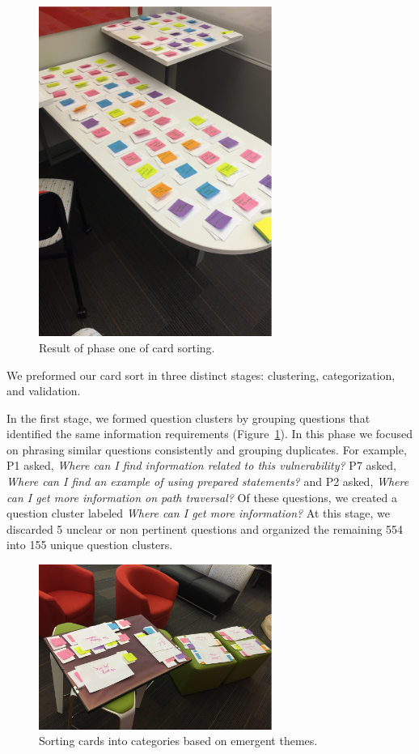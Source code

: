 \documentclass[conference]{IEEEtran}
\begin{document}
\begin{figure}
\centering
\includegraphics[width=3in]{Images/notecards.pdf}
\caption{Result of phase one of card sorting.}
\label{fig:stageOne} 
\end{figure}

We preformed our card sort in three distinct stages: clustering, categorization, and validation.
 
In the first stage, we formed question clusters by grouping questions that identified the same information requirements (Figure~\ref{fig:stageOne}). 
In this phase we focused on phrasing similar questions consistently and grouping duplicates.
For example, P1 asked, \textit{Where can I find information related to this vulnerability?} P7 asked, \textit{Where can I find an example of using prepared statements?} and P2 asked, \textit{Where can I get more information on path traversal?} 
Of these questions, we created a question cluster labeled \textit{Where can I get more information?}
At this stage, we discarded 5 unclear or non pertinent questions and organized the remaining 554 into 155 unique question clusters.

\begin{figure}
\centering
\includegraphics[width=3in]{Images/categories.pdf}
\caption{Sorting cards into categories based on emergent themes.}
\label{fig:cardsort} 
\end{figure}
\end{document}
